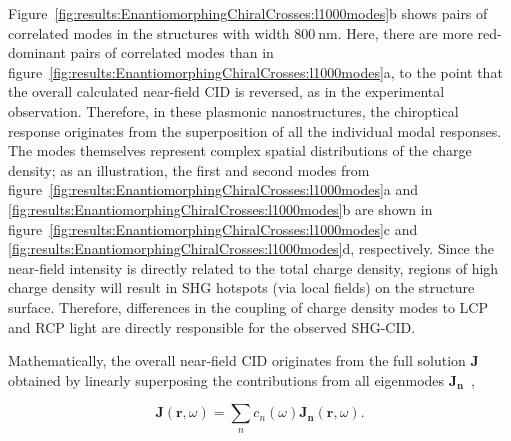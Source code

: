 Figure~\ref{fig:results:EnantiomorphingChiralCrosses:l1000modes}b shows pairs of correlated modes in the structures with width $\SI{800}{\nano\m}$. Here, there are more red-dominant pairs of correlated modes than in figure~\ref{fig:results:EnantiomorphingChiralCrosses:l1000modes}a, to the point that the overall calculated near-field CID is reversed, as in the experimental observation. Therefore, in these plasmonic nanostructures, the chiroptical response originates from the superposition of all the individual modal responses. 
The modes themselves represent complex spatial distributions of the charge density; as an illustration, the first and second modes from figure~\ref{fig:results:EnantiomorphingChiralCrosses:l1000modes}a and \ref{fig:results:EnantiomorphingChiralCrosses:l1000modes}b are shown in figure~\ref{fig:results:EnantiomorphingChiralCrosses:l1000modes}c and \ref{fig:results:EnantiomorphingChiralCrosses:l1000modes}d, respectively.
Since the near-field intensity is directly related to the total charge density, regions of high charge density will result in SHG hotspots (via local fields) on the structure surface. Therefore, differences in the coupling of charge density modes to LCP and RCP light are directly responsible for the observed SHG-CID.

Mathematically, the overall near-field CID originates from the full solution $\mathbf{J}$ obtained by linearly superposing the contributions from all eigenmodes $\mathbf{J_n}$~\cite{Zheng2014}, 

\begin{equation}\label{eq:background:ChiropticalEffects:totalSolution}	
	\mathbf{J} (\mathbf{r}, \omega) = \sum \limits_{n} c_{n}(\omega) \mathbf{J_{n}}(\mathbf{r}, \omega).
\end{equation}

